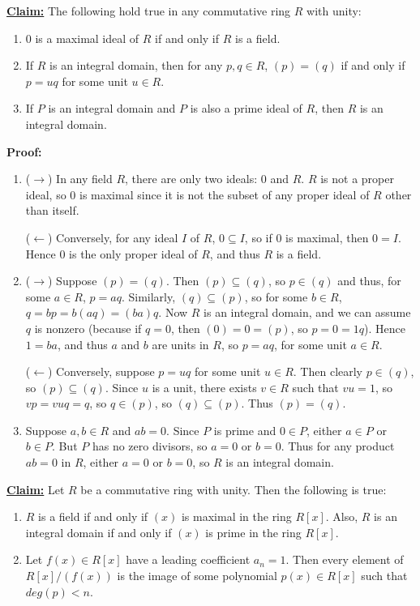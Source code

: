 \documentclass{article}
\begin{document}
\noindent \textbf{\underline{Claim:}} The following hold true in any commutative ring $R$ with unity:
\begin{enumerate}
    \item $0$ is a maximal ideal of $R$ if and only if $R$ is a field.
    \item If $R$ is an integral domain, then for any $p,q\in R$, $(p) = (q)$ if and only if $p=uq$ for some unit $u\in R$.
    \item If $P$ is an integral domain and $P$ is also a prime ideal of $R$, then $R$ is an integral domain. 
\end{enumerate}

\noindent \textbf{Proof:}\begin{enumerate}
    \item ($\rightarrow$) In any field $R$, there are only two ideals: $0$ and $R$. $R$ is not a proper ideal, so $0$ is maximal since it is not the subset of any proper ideal of $R$ other than itself.
    
    ($\leftarrow$) Conversely, for any ideal $I$ of $R$, $0\subseteq I$, so if $0$ is maximal, then $0=I$. Hence $0$ is the only proper ideal of $R$, and thus $R$ is a field.
    
    \item ($\rightarrow$) Suppose $(p)=(q)$. Then $(p)\subseteq (q)$, so $p\in (q)$ and thus, for some $a\in R$, $p=aq$. Similarly, $(q)\subseteq (p)$, so for some $b\in R$, $q=bp=b(aq)=(ba)q$. Now $R$ is an integral domain, and we can assume $q$ is nonzero (because if $q=0$, then $(0)=0=(p)$, so $p=0=1q$). Hence $1=ba$, and thus $a$ and $b$ are units in $R$, so $p=aq$, for some unit $a\in R$.
    
    ($\leftarrow$) Conversely, suppose $p=uq$ for some unit $u\in R$. Then clearly $p\in (q)$, so $(p)\subseteq (q)$. Since $u$ is a unit, there exists $v\in R$ such that $vu=1$, so $vp=vuq=q$, so $q\in (p)$, so $(q)\subseteq (p)$. Thus $(p)=(q)$.
    
    \item Suppose $a,b\in R$ and $ab=0$. Since $P$ is prime and $0\in P$, either $a\in P$ or $b\in P$. But $P$ has no zero divisors, so $a=0$ or $b=0$. Thus for any product $ab=0$ in $R$, either $a=0$ or $b=0$, so $R$ is an integral domain.
\end{enumerate}

\noindent \textbf{\underline{Claim:}} Let $R$ be a commutative ring with unity. Then the following is true:

\begin{enumerate}
    \item $R$ is a field if and only if $(x)$ is maximal in the ring $R[x]$. Also, $R$ is an integral domain if and only if $(x)$ is prime in the ring $R[x]$.
    
    \item Let $f(x)\in R[x]$ have a leading coefficient $a_n=1$. Then every element of $R[x]/(f(x))$ is the image of some polynomial $p(x)\in R[x]$ such that $deg(p)<n$.
\end{enumerate}
\end{document}

